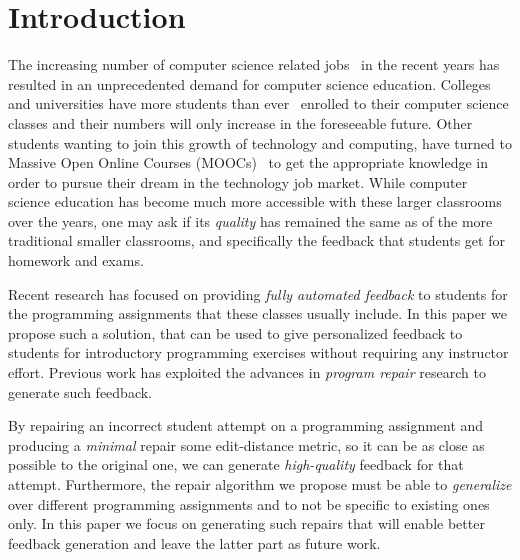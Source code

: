\section{Introduction}
\label{sec:intro}

The increasing number of computer science related
jobs~\citep[][]{compsci-demand} in the recent years has resulted in an
unprecedented demand for computer science education. Colleges and universities
have more students than ever~\citep[][]{compsci-classes} enrolled to their
computer science classes and their numbers will only increase in the foreseeable
future. Other students wanting to join this growth of technology and computing,
have turned to Massive Open Online Courses (MOOCs)~\citep[][]{moocs} to get the
appropriate knowledge in order to pursue their dream in the technology job
market. While computer science education has become much more accessible with
these larger classrooms over the years, one may ask if its \emph{quality} has
remained the same as of the more traditional smaller classrooms, and
specifically the feedback that students get for homework and exams.

Recent research has focused on providing \emph{fully automated feedback} to
students for the programming assignments that these classes usually include. In
this paper we propose such a solution, that can be used to give personalized
feedback to students for introductory programming exercises without requiring
any instructor effort. Previous work has exploited the advances in \emph{program
repair} research to generate such feedback.

By repairing an incorrect student attempt on a programming assignment and
producing a \emph{minimal} repair \wrt some edit-distance metric, so it can be
as close as possible to the original one, we can generate \emph{high-quality}
feedback for that attempt. Furthermore, the repair algorithm we propose must be
able to \emph{generalize} over different programming assignments and to not be
specific to existing ones only. In this paper we focus on generating such
repairs that will enable better feedback generation and leave the latter part as
future work.





